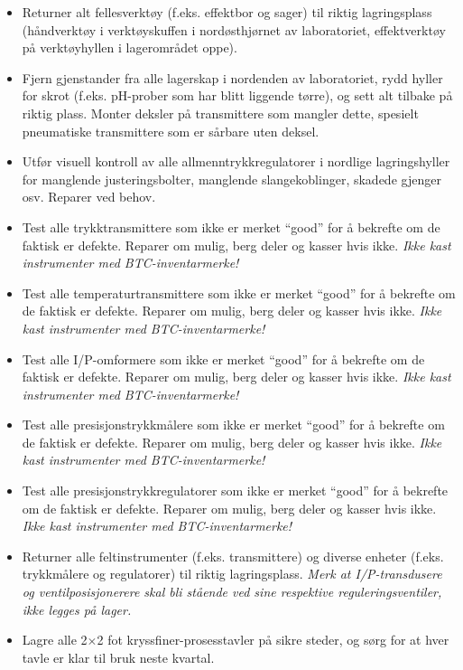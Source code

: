 \begin{itemize}
\item{} \underbar{\hskip 50pt} Returner alt fellesverktøy (f.eks. effektbor og sager) til riktig lagringsplass (håndverktøy i verktøyskuffen i nordøsthjørnet av laboratoriet, effektverktøy på verktøyhyllen i lagerområdet oppe).
\item{} \underbar{\hskip 50pt} Fjern gjenstander fra alle lagerskap i nordenden av laboratoriet, rydd hyller for skrot (f.eks. pH-prober som har blitt liggende tørre), og sett alt tilbake på riktig plass. Monter deksler på transmittere som mangler dette, spesielt pneumatiske transmittere som er sårbare uten deksel.
\item{} \underbar{\hskip 50pt} Utfør visuell kontroll av alle allmenntrykkregulatorer i nordlige lagringshyller for manglende justeringsbolter, manglende slangekoblinger, skadede gjenger osv. Reparer ved behov.
\item{} \underbar{\hskip 50pt} Test alle trykktransmittere som ikke er merket ``good'' for å bekrefte om de faktisk er defekte. Reparer om mulig, berg deler og kasser hvis ikke. {\it Ikke kast instrumenter med BTC-inventarmerke!}
\item{} \underbar{\hskip 50pt} Test alle temperaturtransmittere som ikke er merket ``good'' for å bekrefte om de faktisk er defekte. Reparer om mulig, berg deler og kasser hvis ikke. {\it Ikke kast instrumenter med BTC-inventarmerke!}
\item{} \underbar{\hskip 50pt} Test alle I/P-omformere som ikke er merket ``good'' for å bekrefte om de faktisk er defekte. Reparer om mulig, berg deler og kasser hvis ikke. {\it Ikke kast instrumenter med BTC-inventarmerke!}
\item{} \underbar{\hskip 50pt} Test alle presisjonstrykkmålere som ikke er merket ``good'' for å bekrefte om de faktisk er defekte. Reparer om mulig, berg deler og kasser hvis ikke. {\it Ikke kast instrumenter med BTC-inventarmerke!}
\item{} \underbar{\hskip 50pt} Test alle presisjonstrykkregulatorer som ikke er merket ``good'' for å bekrefte om de faktisk er defekte. Reparer om mulig, berg deler og kasser hvis ikke. {\it Ikke kast instrumenter med BTC-inventarmerke!}
\item{} \underbar{\hskip 50pt} Returner alle feltinstrumenter (f.eks. transmittere) og diverse enheter (f.eks. trykkmålere og regulatorer) til riktig lagringsplass. {\it Merk at I/P-transdusere og ventilposisjonerere skal bli stående ved sine respektive reguleringsventiler, ikke legges på lager.}
\item{} \underbar{\hskip 50pt} Lagre alle 2$\times$2 fot kryssfiner-prosesstavler på sikre steder, og sørg for at hver tavle er klar til bruk neste kvartal.

\end{itemize}

